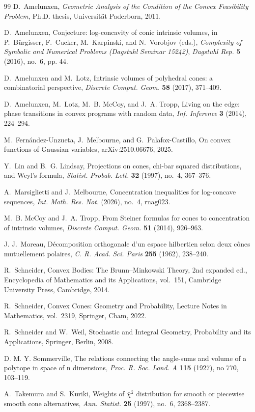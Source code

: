 \documentclass[12pt,a4paper]{article}
\numberwithin{equation}{section}
\theoremstyle{definition}
\theoremstyle{remark}
\begin{document}
\begin{thebibliography}{99}
D.~Amelunxen,
\emph{Geometric Analysis of the Condition of the Convex Feasibility
Problem}, Ph.D. thesis, Universität Paderborn, 2011.

D.~Amelunxen,
Conjecture: log-concavity of conic intrinsic volumes,
in P.~B\"urgisser, F.~Cucker, M.~Karpinski, and N.~Vorobjov (eds.),
\emph{Complexity of Symbolic and Numerical Problems
(Dagstuhl Seminar 15242)},
\emph{Dagstuhl Rep.} \textbf{5} (2016), no.~6, pp. 44.


D.~Amelunxen and M.~Lotz,
Intrinsic volumes of polyhedral cones: a combinatorial perspective,
\emph{Discrete Comput. Geom.} \textbf{58} (2017), 371--409.

D.~Amelunxen, M.~Lotz, M.~B. McCoy, and J.~A. Tropp,
Living on the edge: phase transitions in convex programs with random
data,
\emph{Inf. Inference} \textbf{3} (2014), 224--294.

M.~Fern\'andez-Unzueta, J.~Melbourne, and G.~Palafox-Castillo,
On convex functions of Gaussian variables,
arXiv:2510.06676, 2025.

Y.~Lin and B.~G. Lindsay,
Projections on cones, chi-bar squared distributions, and Weyl's formula,
\emph{Statist. Probab. Lett.} \textbf{32} (1997), no.~4, 367--376.

A.~Marsiglietti and J.~Melbourne,
Concentration inequalities for log-concave sequences,
\emph{Int. Math. Res. Not.} (2026), no.~4, rnag023.

M.~B. McCoy and J.~A. Tropp,
From Steiner formulas for cones to concentration of intrinsic volumes,
\emph{Discrete Comput. Geom.} \textbf{51} (2014), 926--963.

J. J.~Moreau,
D\'ecomposition orthogonale d'un espace hilbertien selon deux c\^ones
mutuellement polaires,
\emph{C. R. Acad. Sci. Paris} \textbf{255} (1962), 238--240.

R.~Schneider,
Convex Bodies: The Brunn--Minkowski Theory,
2nd expanded ed., Encyclopedia of Mathematics and its Applications,
vol.~151, Cambridge University Press, Cambridge, 2014.

R.~Schneider,
Convex Cones: Geometry and Probability,
Lecture Notes in Mathematics, vol.~2319,
Springer, Cham, 2022.

R.~Schneider and W.~Weil,
Stochastic and Integral Geometry,
Probability and its Applications, Springer, Berlin, 2008.

D. M. Y. Sommerville, The relations connecting the angle-sums and volume of a polytope in
space of n dimensions, \emph{Proc. R. Soc. Lond. A} \textbf{115} (1927), no 770, 103--119.

A.~Takemura and S.~Kuriki,
Weights of $\bar\chi^2$ distribution for smooth or piecewise smooth
cone alternatives,
\emph{Ann. Statist.} \textbf{25} (1997), no.~6, 2368--2387.

\end{thebibliography}
\endgroup
\end{document}
